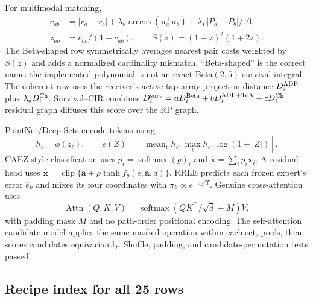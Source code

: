 \documentclass[10pt]{article}
\begin{document}
For multimodal matching,
\begin{align}
 c_{ab}&=|r_a-r_b|+\lambda_\theta\arccos(\mathbf u_a^\top\mathbf u_b)
 +\lambda_P|P_a-P_b|/10,\\
 z_{ab}&=c_{ab}/(1+c_{ab}),\qquad S(z)=(1-z)^2(1+2z).
\end{align}
The Beta-shaped row symmetrically averages nearest pair costs weighted by
$S(z)$ and adds a normalized cardinality mismatch.  ``Beta-shaped'' is the
correct name: the implemented polynomial is not an exact Beta$(2,5)$ survival
integral.  The coherent row uses the receiver's active-tap array projection
distance $D_i^{\rm ADP}$ plus $\lambda_dD_i^{\rm Ch}$.  Survival--CIR combines
$D_i^{\rm surv}=aD_i^{\rm Beta}+bD_i^{\rm ADP+ToA}+cD_i^{\rm Ch}$; residual
graph diffuses this score over the RP graph.

PointNet/Deep-Sets encode tokens using
\begin{equation}
 h_\ell=\phi(z_\ell),\qquad e(Z)=
 [\operatorname{mean}_\ell h_\ell,\operatorname{max}_\ell h_\ell,
 \log(1+|Z|)].
\end{equation}
CAEZ-style classification uses $p_i=\operatorname{softmax}(g)_i$ and
$\widehat{\mathbf x}=\sum_i p_i\mathbf x_i$.  A residual head uses
$\widehat{\mathbf x}=\operatorname{clip}\{\mathbf a+\rho\tanh f_\theta(e,\mathbf a,d)\}$.
RRLE predicts each frozen expert's error $\widehat e_k$ and mixes its four
coordinates with $\pi_k\propto e^{-\widehat e_k/T}$.  Genuine cross-attention
uses
\begin{equation}
 \operatorname{Attn}(Q,K,V)=\operatorname{softmax}
 \left(QK^\top/\sqrt d+M\right)V,
\end{equation}
with padding mask $M$ and no path-order positional encoding.  The self-attention
candidate model applies the same masked operation within each set, pools, then
scores candidates equivariantly.  Shuffle, padding, and candidate-permutation
tests passed.

\subsection{Recipe index for all 25 rows}
\end{document}
